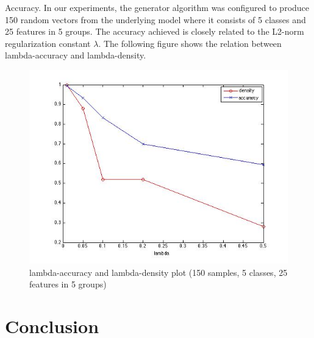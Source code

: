 \documentclass[11pt]{article}
\begin{document}
Accuracy. In our experiments, the generator algorithm was configured to produce 150 random vectors from the underlying model where it consists of 5 classes and 25 features in 5 groups. The accuracy achieved is closely related to the L2-norm regularization constant $\lambda$. The following figure shows the relation between lambda-accuracy and lambda-density.\\

\begin{figure}[ht]
\begin{center}
	\includegraphics[width=\linewidth]{m3_img}
	\caption{lambda-accuracy and lambda-density plot (150 samples, 5 classes, 25 features in 5 groups)}
\end{center}
\end{figure}




\section{Conclusion}
%
%
\end{document}
